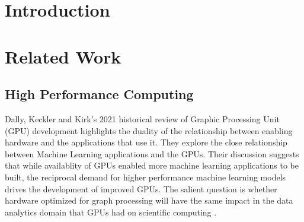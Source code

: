 \documentclass[sigconf,anonymous, authordraft]{acmart}
\begin{document}
\section{Introduction}


\section{Related Work}

\subsection{High Performance Computing}
\par{Dally, Keckler and Kirk's 2021 historical review of Graphic Processing Unit (GPU) development highlights the duality of the relationship between enabling hardware and the applications that use it. 
They explore the close relationship between Machine Learning applications and the GPUs. Their discussion suggests that while availablity of GPUs enabled more machine learning applications to be built, the reciprocal demand for higher performance machine learning models drives the development of improved GPUs. 
The salient question is whether hardware optimized for graph processing will have the same impact in the data analytics domain that GPUs had on scientific computing \cite{Dally2021}.}
\end{document}
